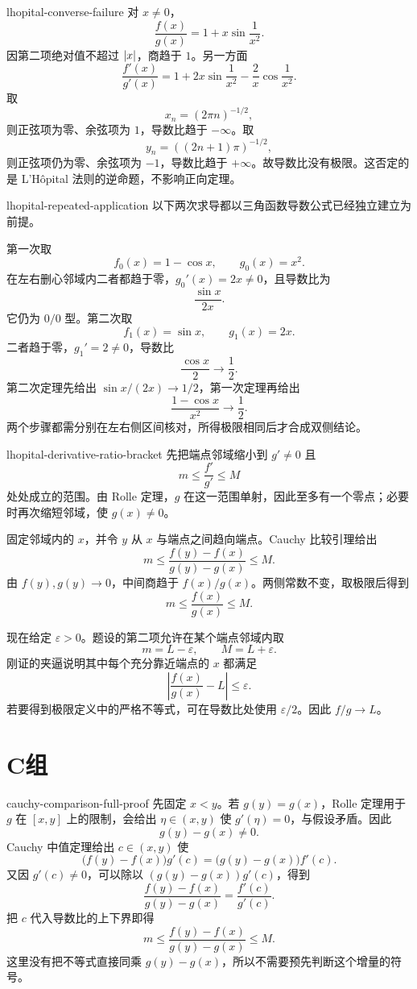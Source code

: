 \begin{solution}{lhopital-converse-failure}
对 \(x\ne0\)，
\[
 \frac{f(x)}{g(x)}
 =1+x\sin\frac1{x^2}.
\]
因第二项绝对值不超过 \(\left|x\right|\)，商趋于 \(1\)。另一方面
\[
 \frac{f'(x)}{g'(x)}
 =1+2x\sin\frac1{x^2}
   -\frac2x\cos\frac1{x^2}.
\]
取
\[
 x_n=(2\pi n)^{-1/2},
\]
则正弦项为零、余弦项为 \(1\)，导数比趋于 \(-\infty\)。取
\[
 y_n=((2n+1)\pi)^{-1/2},
\]
则正弦项仍为零、余弦项为 \(-1\)，导数比趋于 \(+\infty\)。故导数比没有极限。这否定的是 L'Hôpital 法则的逆命题，不影响正向定理。
\end{solution}

\begin{solution}{lhopital-repeated-application}
以下两次求导都以三角函数导数公式已经独立建立为前提。

第一次取
\[
 f_0(x)=1-\cos x,\qquad g_0(x)=x^2.
\]
在左右删心邻域内二者都趋于零，\(g_0'(x)=2x\ne0\)，且导数比为
\[
 \frac{\sin x}{2x}.
\]
它仍为 \(0/0\) 型。第二次取
\[
 f_1(x)=\sin x,\qquad g_1(x)=2x.
\]
二者趋于零，\(g_1'=2\ne0\)，导数比
\[
 \frac{\cos x}{2}\longrightarrow\frac12.
\]
第二次定理先给出 \(\sin x/(2x)\to1/2\)，第一次定理再给出
\[
 \frac{1-\cos x}{x^2}\longrightarrow\frac12.
\]
两个步骤都需分别在左右侧区间核对，所得极限相同后才合成双侧结论。
\end{solution}

\begin{solution}{lhopital-derivative-ratio-bracket}
先把端点邻域缩小到 \(g'\ne0\) 且
\[
 m\le\frac{f'}{g'}\le M
\]
处处成立的范围。由 Rolle 定理，\(g\) 在这一范围单射，因此至多有一个零点；必要时再次缩短邻域，使 \(g(x)\ne0\)。

固定邻域内的 \(x\)，并令 \(y\) 从 \(x\) 与端点之间趋向端点。Cauchy 比较引理给出
\[
 m\le\frac{f(y)-f(x)}{g(y)-g(x)}\le M.
\]
由 \(f(y),g(y)\to0\)，中间商趋于 \(f(x)/g(x)\)。两侧常数不变，取极限后得到
\[
 m\le\frac{f(x)}{g(x)}\le M.
\]

现在给定 \(\varepsilon>0\)。题设的第二项允许在某个端点邻域内取
\[
 m=L-\varepsilon,\qquad M=L+\varepsilon.
\]
刚证的夹逼说明其中每个充分靠近端点的 \(x\) 都满足
\[
 \left|\frac{f(x)}{g(x)}-L\right|\le\varepsilon.
\]
若要得到极限定义中的严格不等式，可在导数比处使用 \(\varepsilon/2\)。因此 \(f/g\to L\)。
\end{solution}

\section*{C组}

\begin{solution}{cauchy-comparison-full-proof}
先固定 \(x<y\)。若 \(g(y)=g(x)\)，Rolle 定理用于 \(g\) 在 \([x,y]\) 上的限制，会给出 \(\eta\in(x,y)\) 使 \(g'(\eta)=0\)，与假设矛盾。因此
\[
 g(y)-g(x)\ne0.
\]
Cauchy 中值定理给出 \(c\in(x,y)\) 使
\[
 \bigl(f(y)-f(x)\bigr)g'(c)
 =
 \bigl(g(y)-g(x)\bigr)f'(c).
\]
又因 \(g'(c)\ne0\)，可以除以
\((g(y)-g(x))g'(c)\)，得到
\[
 \frac{f(y)-f(x)}{g(y)-g(x)}
 =
 \frac{f'(c)}{g'(c)}.
\]
把 \(c\) 代入导数比的上下界即得
\[
 m\le
 \frac{f(y)-f(x)}{g(y)-g(x)}
 \le M.
\]
这里没有把不等式直接同乘 \(g(y)-g(x)\)，所以不需要预先判断这个增量的符号。
\end{solution}

